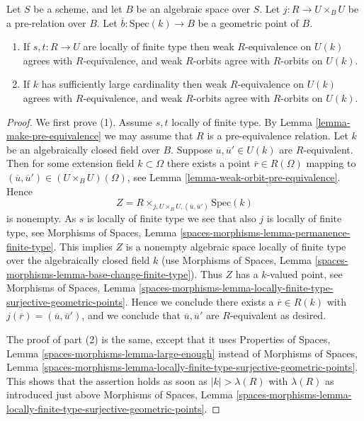 \begin{lemma}
\label{lemma-geometric-orbits}
Let $S$ be a scheme, and let $B$ be an algebraic space over $S$.
Let $j : R \to U \times_B U$ be a pre-relation over $B$.
Let $\overline{b} : \text{Spec}(k) \to B$ be a geometric point of $B$.
\begin{enumerate}
\item If $s, t : R \to U$ are locally of finite type
then weak $R$-equivalence on $U(k)$ agrees with $R$-equivalence, and
weak $R$-orbits agree with $R$-orbits on $U(k)$.
\item If $k$ has sufficiently large cardinality then weak $R$-equivalence
on $U(k)$ agrees with $R$-equivalence, and weak $R$-orbits agree
with $R$-orbits on $U(k)$.
\end{enumerate}
\end{lemma}

\begin{proof}
We first prove (1). Assume $s, t$ locally of finite type. By
Lemma \ref{lemma-make-pre-equivalence}
we may assume that $R$ is a pre-equivalence relation.
Let $k$ be an algebraically closed field over $B$.
Suppose $\overline{u}, \overline{u}' \in U(k)$ are $R$-equivalent.
Then for some extension field $k \subset \Omega$ there exists
a point $\overline{r} \in R(\Omega)$ mapping to
$(\overline{u}, \overline{u}') \in (U \times_B U)(\Omega)$, see
Lemma \ref{lemma-weak-orbit-pre-equivalence}.
Hence
$$
Z = R \times_{j, U \times_B U, (\overline{u}, \overline{u}')} \text{Spec}(k)
$$
is nonempty. As $s$ is locally of finite type we see that
also $j$ is locally of finite type, see
Morphisms of Spaces, Lemma \ref{spaces-morphisms-lemma-permanence-finite-type}.
This implies $Z$ is a nonempty algebraic space locally of finite type
over the algebraically closed field $k$ (use
Morphisms of Spaces,
Lemma \ref{spaces-morphisms-lemma-base-change-finite-type}).
Thus $Z$ has a $k$-valued point, see
Morphisms of Spaces, Lemma
\ref{spaces-morphisms-lemma-locally-finite-type-surjective-geometric-points}.
Hence we conclude there exists a $\overline{r} \in R(k)$ with
$j(\overline{r}) = (\overline{u}, \overline{u}')$, and we conclude that
$\overline{u}, \overline{u}'$ are $R$-equivalent as desired.

\medskip\noindent
The proof of part (2) is the same, except that it uses
Properties of Spaces, Lemma \ref{spaces-morphisms-lemma-large-enough}
instead of
Morphisms of Spaces, Lemma
\ref{spaces-morphisms-lemma-locally-finite-type-surjective-geometric-points}.
This shows that the assertion holds as soon as $|k| > \lambda(R)$ with
$\lambda(R)$ as introduced just above
Morphisms of Spaces, Lemma
\ref{spaces-morphisms-lemma-locally-finite-type-surjective-geometric-points}.
\end{proof}

